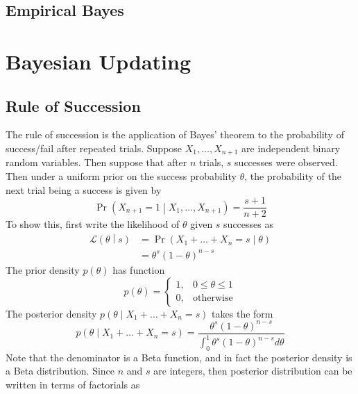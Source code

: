 \documentclass[11pt]{report} %
\begin{document}
\subsection{Empirical Bayes}

\section{Bayesian Updating}

\subsection{Rule of Succession}

The rule of succession is the application of Bayes' theorem to the probability of success/fail after repeated trials. Suppose $X_{1}, \dots, X_{n + 1}$ are independent binary random variables. Then suppose that after $n$ trials, $s$ successes were observed. Then under a uniform prior on the success probability $\theta$, the probability of the next trial being a success is given by
\begin{equation}
\operatorname{Pr}\left(X_{n + 1} = 1\middle|X_{1}, \dots, X_{n + 1}\right) = \dfrac{s + 1}{n + 2}
\end{equation}
To show this, first write the likelihood of $\theta$ given $s$ successes as
\begin{align}
\mathcal{L}\left(\theta\middle|s\right) &= \operatorname{Pr}\left(X_{1} + \dots + X_{n} = s\middle|\theta\right) \\
&= \theta^{s}\left(1 - \theta\right)^{n - s}
\end{align}
The prior density $p\left(\theta\right)$ has function
\begin{equation}
p\left(\theta\right) = \begin{cases} 1, & 0\leq \theta \leq 1 \\ 0, & \mathrm{otherwise}\end{cases}
\end{equation}
The posterior density $p\left(\theta\middle|X_{1} + \dots + X_{n} = s\right)$ takes the form
\begin{equation}
p\left(\theta\middle|X_{1} + \dots + X_{n} = s\right) = \dfrac{\theta^{s}\left(1 - \theta\right)^{n - s}}{\int_{0}^{1}\theta^{s}\left(1 - \theta\right)^{n - s}d\theta}
\end{equation}
Note that the denominator is a Beta function, and in fact the posterior density is a Beta distribution. Since $n$ and $s$ are integers, then posterior distribution can be written in terms of factorials as
\end{document}
